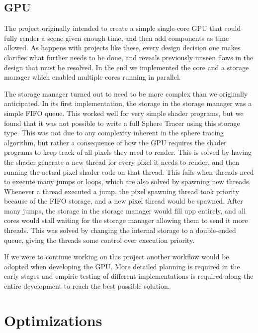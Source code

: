 		\subsection{GPU} 
		
			The project originally intended to create a simple single-core GPU
			that could fully render a scene given enough time, and then add	
			components as time allowed. As happens with projects like these,
			every design decision one makes clarifies what further needs to be
			done, and reveals previously unseen flaws in the design that must
			be resolved. In the end we implemented the core and a storage 
			manager which enabled multiple cores running in parallel.

			The storage manager turned out to need to be more complex than we 
			originally anticipated. In its first implementation, the storage in
			the storage manager was a simple FIFO queue. This worked well for 
			very simple shader programs, but we found that it was not possible
			to write a full Sphere Tracer using this storage type. This was not
			due to any complexity inherent in the sphere tracing algorithm, but
			rather a consequence of how the GPU requires the shader programs to
			keep track of all pixels they need to render. This is solved by 
			having the shader generate a new thread for every pixel it needs to
			render, and then running the actual pixel shader code on that 
			thread. This fails when threads need to execute many jumps or 
			loops, which are also solved by spawning new threads. Whenever a 
			thread executed a jump, the pixel spawning thread took priority 
			because of the FIFO storage, and a new pixel thread would be 
			spawned. After many jumps, the storage in the storage manager would 
			fill upp entirely, and all cores would stall waiting for the 
			storage manager allowing them to send it more threads. This was 
			solved by changing the internal storage to a double-ended queue,
			giving the threads some control over execution priority.

			If we were to continue working on this project another workflow
			would be adopted when developing the GPU. More detailed planning is
			required in the early stages and empiric testing of different
			implementations is required along the entire development to reach
			the best possible solution.

	\section{Optimizations} \label{optimization}

